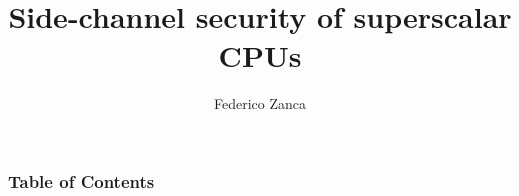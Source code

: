 \documentclass{beamer}
\title[Power Analysis Side-channel Attacks] %
{Side-channel security of superscalar CPUs}
\subtitle{}
\author[Federico Zanca] %
{Federico Zanca}
\institute[] %
{
  Computer Science and Engineering\\
  Politecnico di Milano
}
\date[2025] %
{}
\begin{document}
\frame{\titlepage}


\begin{frame}
\frametitle{Table of Contents}
\tableofcontents
\end{frame}









\end{document}
